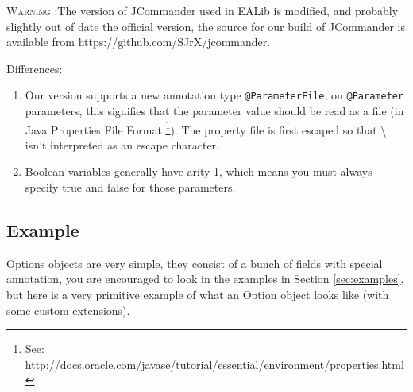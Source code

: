 \documentclass[11pt,letterpaper,oneside]{article}
\begin{document}
{\Large \textsc{Warning} }:The version of JCommander used in EALib is modified, and probably slightly out of date the official version, the source for our build of JCommander is available from https://github.com/SJrX/jcommander.

Differences:
\begin{enumerate}
\item Our version supports a new annotation type \texttt{@ParameterFile}, on \texttt{@Parameter} parameters, this signifies that the parameter value should be read as a file (in Java Properties File Format \footnote{See: http://docs.oracle.com/javase/tutorial/essential/environment/properties.html}). The property file is first escaped so that \textbackslash $~$ isn't interpreted as an escape character. 

\item Boolean variables generally have arity 1, which means you must always specify true and false for those parameters.
\end{enumerate}

\subsection{Example}

Options objects are very simple, they consist of a bunch of fields with special annotation, you are encouraged to look in the examples in Section \ref{sec:examples}, but here is a very primitive example of what an Option object looks like (with some custom extensions).


  
 
 

  
  
\end{document}
